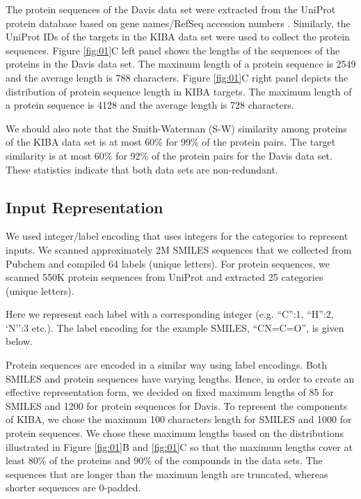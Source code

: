\documentclass[11pt,letterpaper]{article}
\begin{document}
The protein sequences of the Davis data set were extracted from the UniProt protein database based on gene names/RefSeq accession numbers  \cite{apweiler2004uniprot}. Similarly, the UniProt IDs of the targets in the KIBA data set were used to collect the protein sequences. Figure \ref{fig:01}C left panel shows the lengths of the sequences of the proteins in the Davis data set. The maximum length of a protein sequence is 2549 and the average length is 788 characters. Figure \ref{fig:01}C right panel depicts the distribution of protein sequence length in KIBA targets.  The maximum length of a protein sequence is 4128 and the average length is 728 characters.

We should also note that the Smith-Waterman (S-W) similarity among proteins of the KIBA data set is at most 60\%  for 99\% of the protein pairs. The target similarity is at most 60\% for 92\% of the protein pairs for the Davis data set. These statistics indicate that both data sets are  non-redundant.


\subsection*{Input Representation}

We used  integer/label encoding that  uses integers  for the categories  to  represent inputs. We scanned  approximately 2M SMILES sequences that we collected from Pubchem and compiled 64 labels (unique letters). For protein sequences, we scanned 550K protein sequences from UniProt and extracted 25 categories (unique letters). 

Here we  represent each label with a corresponding integer (e.g. ``C'':1, ``H'':2, `N'':3 etc.). The label encoding for the example SMILES, ``CN=C=O'', is given below.  

 

Protein sequences are encoded in a similar way using label encodings. Both SMILES and protein sequences have varying lengths. Hence, in order to create an effective representation form, we decided on fixed maximum lengths of 85 for SMILES and 1200 for protein sequences for Davis. To represent the components of KIBA, we chose the maximum 100 characters length for SMILES and 1000 for protein sequences. We chose these maximum lengths based on the distributions illustrated in Figure \ref{fig:01}B and \ref{fig:01}C so that the maximum lengths cover at least 80\% of the proteins and 90\% of the compounds in the data sets. The sequences that are longer than the maximum length are truncated, whereas shorter sequences are 0-padded.
\end{document}

